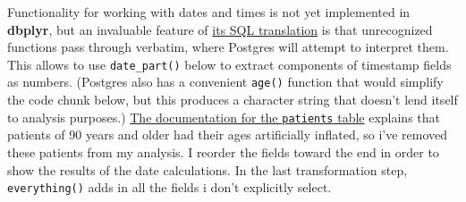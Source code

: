 \documentclass[]{article}
\begin{document}
Functionality for working with dates and times is not yet implemented in
\textbf{dbplyr}, but an invaluable feature of
\href{https://dbplyr.tidyverse.org/articles/sql-translation.html}{its
SQL translation} is that unrecognized functions pass through verbatim,
where Postgres will attempt to interpret them. This allows to use
\texttt{date\_part()} below to extract components of timestamp fields as
numbers. (Postgres also has a convenient \texttt{age()} function that
would simplify the code chunk below, but this produces a character
string that doesn't lend itself to analysis purposes.)
\href{https://mimic.mit.edu/docs/III/tables/patients.html}{The
documentation for the \texttt{patients} table} explains that patients of
90 years and older had their ages artificially inflated, so i've removed
these patients from my analysis. I reorder the fields toward the end in
order to show the results of the date calculations. In the last
transformation step, \texttt{everything()} adds in all the fields i
don't explicitly select.
\end{document}

